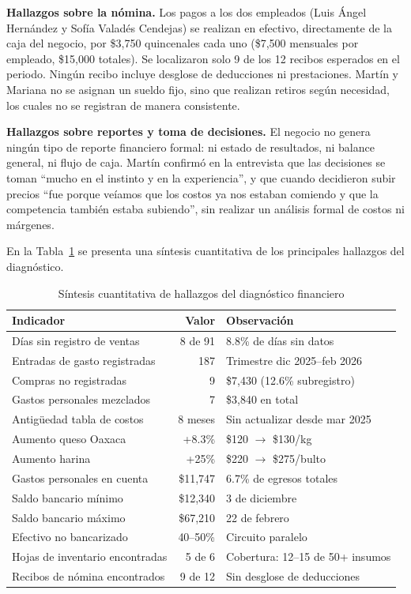\documentclass[12pt,letterpaper]{article}
\begin{document}
\textbf{Hallazgos sobre la nómina.} Los pagos a los dos empleados (Luis Ángel Hernández y Sofía Valadés Cendejas) se realizan en efectivo, directamente de la caja del negocio, por \$3,750 quincenales cada uno (\$7,500 mensuales por empleado, \$15,000 totales). Se localizaron solo 9 de los 12 recibos esperados en el periodo. Ningún recibo incluye desglose de deducciones ni prestaciones. Martín y Mariana no se asignan un sueldo fijo, sino que realizan retiros según necesidad, los cuales no se registran de manera consistente.

\textbf{Hallazgos sobre reportes y toma de decisiones.} El negocio no genera ningún tipo de reporte financiero formal: ni estado de resultados, ni balance general, ni flujo de caja. Martín confirmó en la entrevista que las decisiones se toman ``mucho en el instinto y en la experiencia'', y que cuando decidieron subir precios ``fue porque veíamos que los costos ya nos estaban comiendo y que la competencia también estaba subiendo'', sin realizar un análisis formal de costos ni márgenes.

En la Tabla~\ref{tab:resumen_hallazgos} se presenta una síntesis cuantitativa de los principales hallazgos del diagnóstico.

\begin{table}[ht]
\centering
\caption{Síntesis cuantitativa de hallazgos del diagnóstico financiero}
\label{tab:resumen_hallazgos}
\begin{tabular}{l r l}
\toprule
\textbf{Indicador} & \textbf{Valor} & \textbf{Observación} \\
\midrule
Días sin registro de ventas      & 8 de 91   & 8.8\% de días sin datos    \\
Entradas de gasto registradas    & 187       & Trimestre dic 2025--feb 2026    \\
Compras no registradas           & 9         & \$7,430 (12.6\% subregistro) \\
Gastos personales mezclados      & 7         & \$3,840 en total           \\
Antigüedad tabla de costos       & 8 meses   & Sin actualizar desde mar 2025 \\
Aumento queso Oaxaca             & +8.3\%    & \$120 $\rightarrow$ \$130/kg  \\
Aumento harina                   & +25\%     & \$220 $\rightarrow$ \$275/bulto \\
Gastos personales en cuenta      & \$11,747  & 6.7\% de egresos totales   \\
Saldo bancario mínimo            & \$12,340  & 3 de diciembre            \\
Saldo bancario máximo            & \$67,210  & 22 de febrero            \\
Efectivo no bancarizado          & 40--50\%  & Circuito paralelo          \\
Hojas de inventario encontradas  & 5 de 6    & Cobertura: 12--15 de 50+ insumos \\
Recibos de nómina encontrados    & 9 de 12   & Sin desglose de deducciones \\
\bottomrule
\end{tabular}
\end{table}
\end{document}
